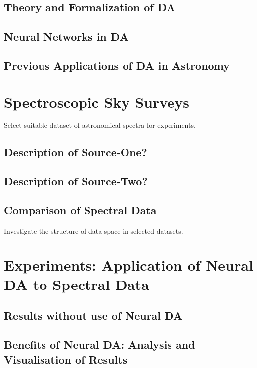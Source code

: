 \documentclass[thesis=M,english]{FITthesis}[2012/10/20]
\begin{document}
\section{Theory and Formalization of DA}

\section{Neural Networks in DA}

\section{Previous Applications of DA in Astronomy}

\chapter{Spectroscopic Sky Surveys}
\label{data_chapter}

Select suitable dataset of astronomical spectra for experiments.

\section{Description of Source-One?}

\section{Description of Source-Two?}

\section{Comparison of Spectral Data}

Investigate the structure of data space in selected datasets.

\chapter{Experiments: Application of Neural DA to Spectral Data}
\label{exp_chapter}


\section{Results without use of Neural DA}

\section{Benefits of Neural DA: Analysis and Visualisation of Results}
\end{document}
